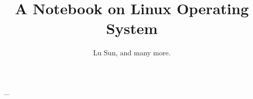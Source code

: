 



\makeindex



\frontmatter

\title{A Notebook on Linux Operating System}
\author{Lu Sun, and many more.}

\maketitle


\tableofcontents


\listoffigures
\listoftables

\mainmatter\_









\appendix






\printindex


